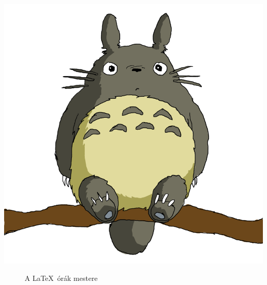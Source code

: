 \documentclass[a4paper]{article}
\begin{document}
\includegraphics[scale=0.2]{totoro.png}
\begin{figure}[bp]
	\center
	\caption{A \LaTeX\ órák mestere}
	\label{fig:sarkany}
\end{figure}
\end{document}

